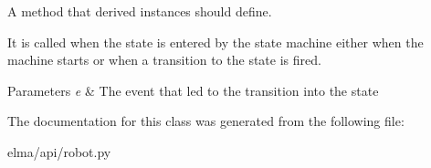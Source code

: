 A method that derived instances should define. 

It is called when the state is entered by the state machine either when the machine starts or when a transition to the state is fired. 
\begin{DoxyParams}{Parameters}
{\em e} & The event that led to the transition into the state \\
\hline
\end{DoxyParams}


The documentation for this class was generated from the following file\+:\begin{DoxyCompactItemize}
\item 
elma/api/robot.\+py\end{DoxyCompactItemize}
